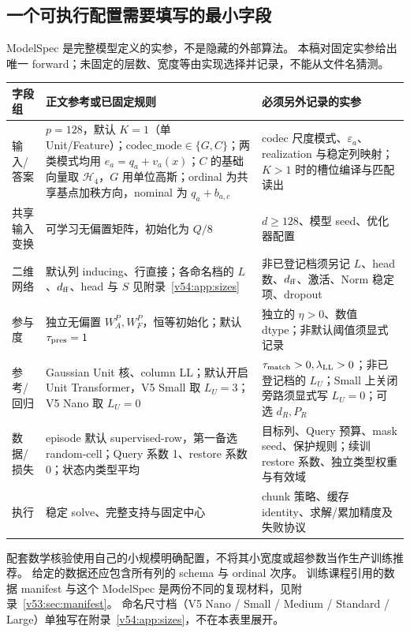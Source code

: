 \documentclass[11pt,UTF8,fontset=fandol]{ctexart}
\numberwithin{equation}{section}
\theoremstyle{definition}
\begin{document}
\subsection{一个可执行配置需要填写的最小字段}
\label{v53:sec:modelspec}
ModelSpec 是完整模型定义的实参，不是隐藏的外部算法。
本稿对固定实参给出唯一 forward；未固定的层数、宽度等由实现选择并记录，不能从文件名猜测。
\begin{center}\small
\begin{tabularx}{\linewidth}{p{33mm}XX}
\toprule
字段组 & 正文参考或已固定规则 & 必须另外记录的实参\\\midrule
输入/答案 & $p=128$，默认 $K=1$（单 Unit/Feature）；$\mathrm{codec\_mode}\in\{G,C\}$；两类模式均用 $e_a=q_a+v_a(x)$；$C$ 的基础向量取 $\mathcal H_4$，$G$ 用单位高斯；ordinal 为共享基点加秩方向，nominal 为 $q_a+b_{a,c}$ & codec 尺度模式、$\varepsilon_a$、realization 与稳定列映射；$K>1$ 时的槽位编译与匹配读出\\
共享输入变换 & 可学习无偏置矩阵，初始化为 $Q/8$ & $d\ge128$、模型 seed、优化器配置\\
二维网络 & 默认列 inducing、行直接；各命名档的 $L$、$d_{\rm ff}$、head 与 $S$ 见附录~\ref{v54:app:sizes} & 非已登记档须另记 $L$、head 数、$d_{\rm ff}$、激活、Norm 稳定项、dropout\\
参与度 & 独立无偏置 $W_A^P,W_F^P$，恒等初始化；默认 $\tau_{\rm pres}=1$ & 独立的 $\eta>0$、数值 dtype；非默认阈值须显式记录\\
参考/回归 & Gaussian Unit 核、column LL；默认开启 Unit Transformer，V5 Small 取 $L_U=3$；V5 Nano 取 $L_U=0$ & $\tau_{\rm match}>0,\lambda_{\rm LL}>0$；非已登记档的 $L_U$；Small 上关闭旁路须显式写 $L_U=0$；可选 $d_R,P_R$\\
数据/损失 & episode 默认 supervised-row，第一备选 random-cell；Query 系数 1、restore 系数 0；状态内类型平均 & 目标列、Query 预算、mask seed、保护规则；续训 restore 系数、独立类型权重与有效域\\
执行 & 稳定 solve、完整支持与固定中心 & chunk 策略、缓存 identity、求解/累加精度及失败协议\\\bottomrule
\end{tabularx}
\end{center}
配套数学核验使用自己的小规模明确配置，不将其小宽度或超参数当作生产训练推荐。
给定的数据还应包含所有列的 schema 与 ordinal 次序。
训练课程引用的数据 manifest 与这个 ModelSpec 是两份不同的复现材料，见附录~\ref{v53:sec:manifest}。
命名尺寸档（V5 Nano / Small / Medium / Standard / Large）单独写在附录~\ref{v54:app:sizes}，不在本表里展开。
\end{document}
